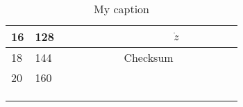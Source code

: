 \begin{table}[H]
\begin{tabular}{llclllllllllllllll}
\multicolumn{1}{|l|}{16}   & \multicolumn{1}{l|}{128} & \multicolumn{5}{l|}{}                                                                                                      & \multicolumn{11}{c|}{$\dot{z}$}                                                                                                                                                                                                                                                        \\ \hline
\multicolumn{1}{|l|}{18}   & \multicolumn{1}{l|}{144} & \multicolumn{16}{c|}{Checksum}                                                                                                                                                                                                                                                                                                                                                                                      \\ \hline
\multicolumn{1}{|l|}{20}   & \multicolumn{1}{l|}{160} & \multicolumn{8}{c|}{}                                                                                                                                                                                 & \multicolumn{1}{l|}{}  & \multicolumn{1}{l|}{}  & \multicolumn{1}{l|}{}   & \multicolumn{1}{l|}{}   & \multicolumn{1}{l|}{}   & \multicolumn{1}{l|}{}   & \multicolumn{1}{l|}{}   & \multicolumn{1}{l|}{}   \\ \hline
                           &                          & \multicolumn{1}{l}{}   &                        &                        &                        &                        &                        &                        &                        &                        &                        &                         &                         &                         &                         &                         &                         \\
                           &                          & \multicolumn{1}{l}{}   &                        &                        &                        &                        &                        &                        &                        &                        &                        &                         &                         &                         &                         &                         &                         \\
                           &                          & \multicolumn{1}{l}{}   &                        &                        &                        &                        &                        &                        &                        &                        &                        &                         &                         &                         &                         &                         &                        
\end{tabular}
\caption{My caption}
\label{tab:Packagestructure}
\end{table}






